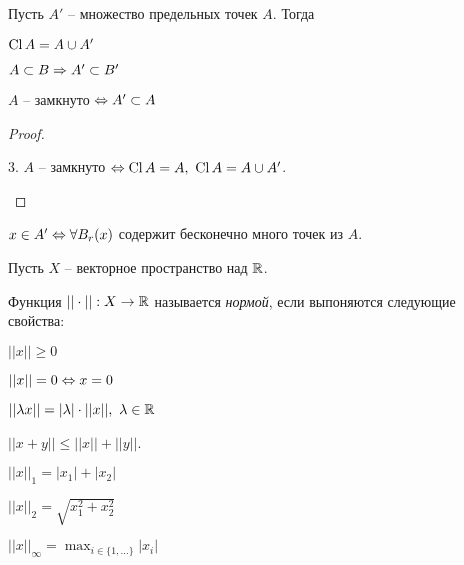     Пусть $A'$ -- множество предельных точек $A$. Тогда
    \begin{Thm}[Свойства]
        \begin{MyList}
            \item $\operatorname{Cl} A = A \cup A'$ 
            \item $A \subset B \Rightarrow A' \subset B'$ 
            \item $A$ -- замкнуто $\Leftrightarrow A' \subset A$
        \end{MyList}
    \end{Thm}

    \begin{proof}
        \begin{MyList}
            \item[3.] $A$ -- замкнуто $\Leftrightarrow \operatorname{Cl} A = A, \ \operatorname{Cl} A = A \cup A'$.
        \end{MyList}
    \end{proof}

    \begin{Thm}
        $x \in A' \Leftrightarrow \forall B_r(x)$ содержит бесконечно много точек из $A$.
    \end{Thm}


    Пусть $X$ -- векторное пространство над $\mathbb{R}$.
    \begin{Def}[Норма]
        Функция $||\cdot|| : X \to \mathbb{R}$ называется \textit{нормой}, если выпоняются следующие свойства:
        \begin{MyList}
            \item $||x|| \geqslant 0$
            \item[] $||x|| = 0 \Leftrightarrow x = 0$
            \item $||\lambda x|| = |\lambda| \cdot ||x||, \ \lambda \in \R$
            \item $||x + y|| \leqslant ||x|| + ||y||$.  
        \end{MyList}
    \end{Def}

    \begin{Example}
        $||x||_1 = |x_1| + |x_2|$
    \end{Example}

    \begin{Example}
        $||x||_2 = \sqrt{x_1^2 + x_2^2}$ 
    \end{Example}

    \begin{Example}
        $||x||_\infty = \max_{i \in \{1, ...\}} |x_i|$
    \end{Example}

